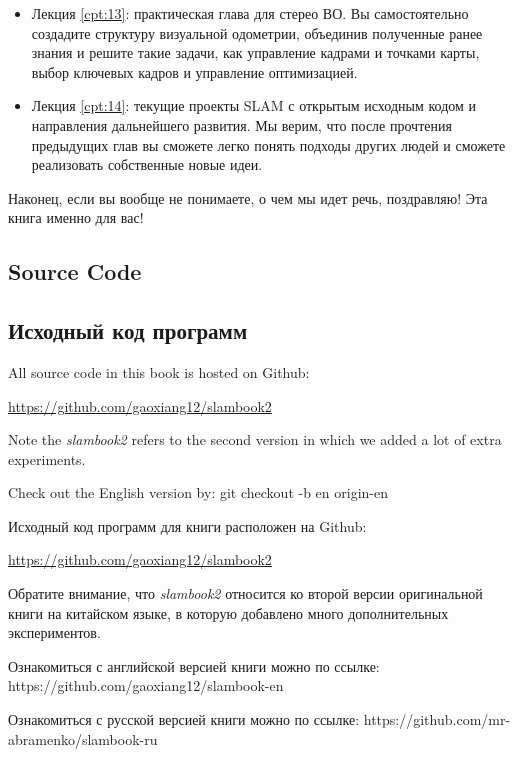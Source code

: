 \begin{Russian}
\begin{itemize}
        \item Лекция \ref{cpt:13}: практическая глава для стерео ВО. Вы самостоятельно создадите структуру визуальной одометрии, объединив полученные ранее знания и решите такие задачи, как управление кадрами и точками карты, выбор ключевых кадров и управление оптимизацией.
        
        \item Лекция \ref{cpt:14}: текущие проекты SLAM с открытым исходным кодом и направления дальнейшего развития. Мы верим, что после прочтения предыдущих глав вы сможете легко понять подходы других людей и сможете реализовать собственные новые идеи.
    \end{itemize}
    
    Наконец, если вы вообще не понимаете, о чем мы идет речь, поздравляю! Эта книга именно для вас!
\end{Russian}

\begin{English}
    \section*{Source Code}
\end{English}

\begin{Russian}
    \section*{Исходный код программ}
\end{Russian}

\begin{English}
    All source code in this book is hosted on Github:

    {\hfill\url{https://github.com/gaoxiang12/slambook2}\hfill}
    
    Note the \textit{slambook2} refers to the second version in which we added a lot of extra experiments.
    
    Check out the English version by:
    {\hfill git checkout -b en origin-en\hfill}
\end{English}

\begin{Russian}
    Исходный код программ для книги расположен на Github:

    {\hfill\url{https://github.com/gaoxiang12/slambook2}\hfill}

    Обратите внимание, что \textit{slambook2} относится ко второй версии оригинальной книги на китайском языке, в которую добавлено много дополнительных экспериментов.

    Ознакомиться с английской версией книги можно по ссылке:
    {\hfill https://github.com/gaoxiang12/slambook-en \hfill}

    Ознакомиться с русской версией книги можно по ссылке:
    {\hfill https://github.com/mr-abramenko/slambook-ru \hfill}
\end{Russian}

